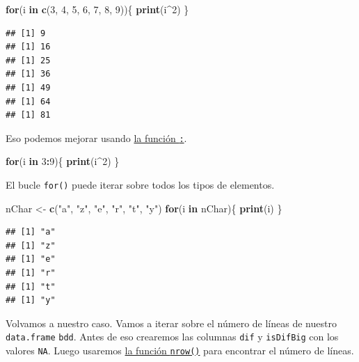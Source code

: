 \documentclass[
]{book}
\newenvironment{Shaded}{\begin{snugshade}}{\end{snugshade}}
\newcommand{\ControlFlowTok}[1]{\textcolor[rgb]{0.13,0.29,0.53}{\textbf{#1}}}
\newcommand{\DecValTok}[1]{\textcolor[rgb]{0.00,0.00,0.81}{#1}}
\newcommand{\KeywordTok}[1]{\textcolor[rgb]{0.13,0.29,0.53}{\textbf{#1}}}
\newcommand{\NormalTok}[1]{#1}
\newcommand{\OperatorTok}[1]{\textcolor[rgb]{0.81,0.36,0.00}{\textbf{#1}}}
\newcommand{\StringTok}[1]{\textcolor[rgb]{0.31,0.60,0.02}{#1}}
\begin{document}
\begin{Shaded}
\begin{Highlighting}[]
\ControlFlowTok{for}\NormalTok{(i }\ControlFlowTok{in} \KeywordTok{c}\NormalTok{(}\DecValTok{3}\NormalTok{, }\DecValTok{4}\NormalTok{, }\DecValTok{5}\NormalTok{, }\DecValTok{6}\NormalTok{, }\DecValTok{7}\NormalTok{, }\DecValTok{8}\NormalTok{, }\DecValTok{9}\NormalTok{))\{}
  \KeywordTok{print}\NormalTok{(i}\OperatorTok{^}\DecValTok{2}\NormalTok{)}
\NormalTok{\}}
\end{Highlighting}
\end{Shaded}

\begin{verbatim}
## [1] 9
## [1] 16
## [1] 25
## [1] 36
## [1] 49
## [1] 64
## [1] 81
\end{verbatim}

Eso podemos mejorar usando \protect\hyperlink{l0152points}{la función \texttt{:}}.

\begin{Shaded}
\begin{Highlighting}[]
\ControlFlowTok{for}\NormalTok{(i }\ControlFlowTok{in} \DecValTok{3}\OperatorTok{:}\DecValTok{9}\NormalTok{)\{}
  \KeywordTok{print}\NormalTok{(i}\OperatorTok{^}\DecValTok{2}\NormalTok{)}
\NormalTok{\}}
\end{Highlighting}
\end{Shaded}

El bucle \texttt{for()} puede iterar sobre todos los tipos de elementos.

\begin{Shaded}
\begin{Highlighting}[]
\NormalTok{nChar <-}\StringTok{ }\KeywordTok{c}\NormalTok{(}\StringTok{"a"}\NormalTok{, }\StringTok{"z"}\NormalTok{, }\StringTok{"e"}\NormalTok{, }\StringTok{"r"}\NormalTok{, }\StringTok{"t"}\NormalTok{, }\StringTok{"y"}\NormalTok{)}
\ControlFlowTok{for}\NormalTok{(i }\ControlFlowTok{in}\NormalTok{ nChar)\{}
  \KeywordTok{print}\NormalTok{(i)}
\NormalTok{\}}
\end{Highlighting}
\end{Shaded}

\begin{verbatim}
## [1] "a"
## [1] "z"
## [1] "e"
## [1] "r"
## [1] "t"
## [1] "y"
\end{verbatim}

Volvamos a nuestro caso. Vamos a iterar sobre el número de líneas de nuestro \texttt{data.frame} \texttt{bdd}. Antes de eso crearemos las columnas \texttt{dif} y \texttt{isDifBig} con los valores \texttt{NA}. Luego usaremos \protect\hyperlink{l015nrow}{la función \texttt{nrow()}} para encontrar el número de líneas.
\end{document}
